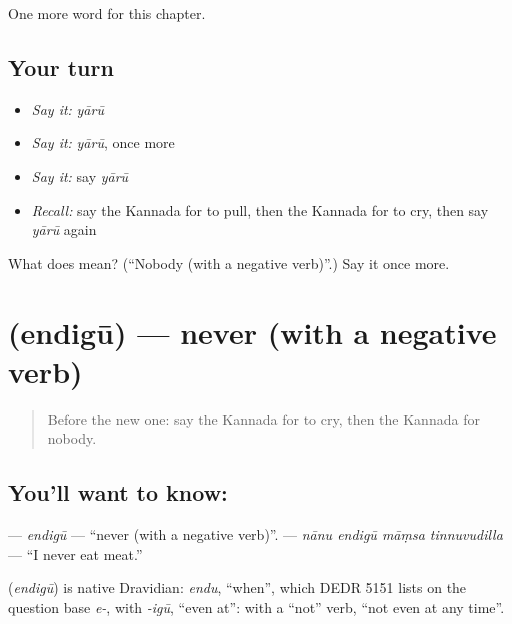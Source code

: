 \begin{grammarlens}[title={What you've built}]
One more word for this chapter.
\end{grammarlens}

\subsection*{Your turn}
\begin{itemize}
\raggedright
  \item \emph{Say it:} \emph{yārū}
  \item \emph{Say it:} \emph{yārū}, once more
  \item \emph{Say it:} say \emph{yārū}
  \item \emph{Recall:} say the Kannada for to pull, then the Kannada for to cry, then say \emph{yārū} again
\end{itemize}

\begin{tcolorbox}[breakable,colback=teal!4,colframe=teal!35!black,title={Before you move on}]
What does  mean? (\textquotedblleft{}Nobody (with a negative verb)\textquotedblright{}.) Say it once more.
\end{tcolorbox}
\section[\texorpdfstring{\kn{ಎಂದಿಗೂ} (endigū)}{ಎಂದಿಗೂ (endigū)}]{ (endigū) — never (with a negative verb)}

\label{lesson:KA-C154-endigu}



\begin{quote}
Before the new one: say the Kannada for to cry, then the Kannada for nobody.
\end{quote}

\subsection*{You'll want to know: }
\textbf{} — \emph{endigū} — \textquotedblleft{}never (with a negative verb)\textquotedblright{}. \textbf{   } — \emph{nānu endigū māṃsa tinnuvudilla} — \textquotedblleft{}I never eat meat.\textquotedblright{}

\begin{cousinweb}
\textbf{} (\emph{endigū}) is native Dravidian: \emph{endu}, \textquotedblleft{}when\textquotedblright{}, which DEDR 5151 lists on the question base \emph{e-}, with \emph{-igū}, \textquotedblleft{}even at\textquotedblright{}: with a \textquotedblleft{}not\textquotedblright{} verb, \textquotedblleft{}not even at any time\textquotedblright{}.
\end{cousinweb}

